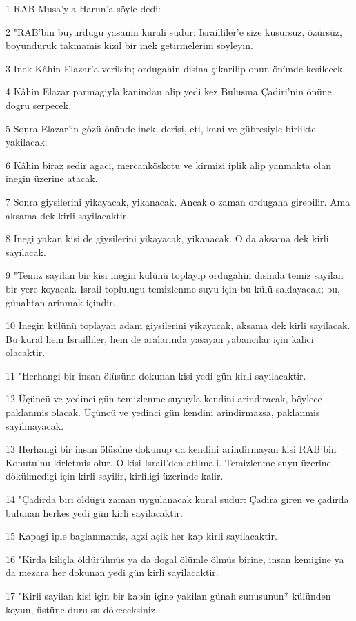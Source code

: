 \par 1 RAB Musa'yla Harun'a söyle dedi:
\par 2 "RAB'bin buyurdugu yasanin kurali sudur: Israilliler'e size kusursuz, özürsüz, boyunduruk takmamis kizil bir inek getirmelerini söyleyin.
\par 3 Inek Kâhin Elazar'a verilsin; ordugahin disina çikarilip onun önünde kesilecek.
\par 4 Kâhin Elazar parmagiyla kanindan alip yedi kez Bulusma Çadiri'nin önüne dogru serpecek.
\par 5 Sonra Elazar'in gözü önünde inek, derisi, eti, kani ve gübresiyle birlikte yakilacak.
\par 6 Kâhin biraz sedir agaci, mercanköskotu ve kirmizi iplik alip yanmakta olan inegin üzerine atacak.
\par 7 Sonra giysilerini yikayacak, yikanacak. Ancak o zaman ordugaha girebilir. Ama aksama dek kirli sayilacaktir.
\par 8 Inegi yakan kisi de giysilerini yikayacak, yikanacak. O da aksama dek kirli sayilacak.
\par 9 "Temiz sayilan bir kisi inegin külünü toplayip ordugahin disinda temiz sayilan bir yere koyacak. Israil toplulugu temizlenme suyu için bu külü saklayacak; bu, günahtan arinmak içindir.
\par 10 Inegin külünü toplayan adam giysilerini yikayacak, aksama dek kirli sayilacak. Bu kural hem Israilliler, hem de aralarinda yasayan yabancilar için kalici olacaktir.
\par 11 "Herhangi bir insan ölüsüne dokunan kisi yedi gün kirli sayilacaktir.
\par 12 Üçüncü ve yedinci gün temizlenme suyuyla kendini arindiracak, böylece paklanmis olacak. Üçüncü ve yedinci gün kendini arindirmazsa, paklanmis sayilmayacak.
\par 13 Herhangi bir insan ölüsüne dokunup da kendini arindirmayan kisi RAB'bin Konutu'nu kirletmis olur. O kisi Israil'den atilmali. Temizlenme suyu üzerine dökülmedigi için kirli sayilir, kirliligi üzerinde kalir.
\par 14 "Çadirda biri öldügü zaman uygulanacak kural sudur: Çadira giren ve çadirda bulunan herkes yedi gün kirli sayilacaktir.
\par 15 Kapagi iple baglanmamis, agzi açik her kap kirli sayilacaktir.
\par 16 "Kirda kiliçla öldürülmüs ya da dogal ölümle ölmüs birine, insan kemigine ya da mezara her dokunan yedi gün kirli sayilacaktir.
\par 17 "Kirli sayilan kisi için bir kabin içine yakilan günah sunusunun* külünden koyun, üstüne duru su dökeceksiniz.
